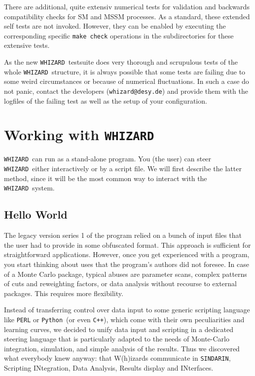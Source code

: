 \documentclass[12pt]{book}
\newcommand{\ttt}[1]{\texttt{#1}}
\newcommand{\whizard}{\ttt{WHIZARD}}
\newcommand{\sindarin}{\ttt{SINDARIN}}
\newcommand{\cpp}{\ttt{C++}}
\newcommand{\python}{\ttt{Python}}
\begin{document}
There are additional, quite extensiv numerical tests for validation
and backwards compatibility checks for SM and MSSM processes. As a
standard, these extended self tests are not invoked. However, they can
be enabled by executing the corresponding specific \ttt{make check}
operations in the subdirectories for these extensive tests.

As the new \whizard\ testsuite does very thorough and scrupulous tests
of the whole \whizard\ structure, it is always possible that some
tests are failing due to some weird circumstances or because of
numerical fluctuations. In such a case do not panic, contact the
developers (\ttt{whizard@desy.de}) and provide them with the logfiles
of the failing test as well as the setup of your configuration.



\clearpage

\chapter{Working with \whizard}
\label{chap:start}

\whizard\ can run as a stand-alone program.  You (the user) can steer
\whizard\ either interactively or by a script file.  We will first
describe the latter method, since it will be the most common way to
interact with the \whizard\ system.

\section{Hello World}

The legacy version series 1 of the program relied on a bunch of input
files that the user had to provide in some obfuscated format.  This
approach is sufficient for straightforward applications.  However, once
you get experienced with a program, you start thinking about uses that
the program's authors did not foresee.  In case of a Monte Carlo
package, typical abuses are parameter scans, complex patterns of cuts
and reweighting factors, or data analysis without recourse to external
packages.  This requires more flexibility.

Instead of transferring control over data input to some generic
scripting language like \ttt{PERL} or \python\ (or even \cpp), which
come with their own peculiarities and learning curves, we decided to
unify data input and scripting in a dedicated steering language that
is particularly adapted to the needs of Monte-Carlo integration,
simulation, and simple analysis of the results.  Thus we discovered
what everybody knew anyway: that W(h)izards communicate in \sindarin,
Scripting INtegration, Data Analysis, Results display and INterfaces.
\end{document}
